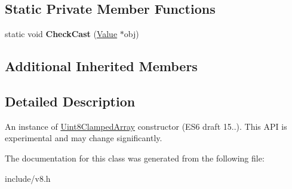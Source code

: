 \subsection*{Static Private Member Functions}
\begin{DoxyCompactItemize}
\item 
static void {\bfseries Check\+Cast} (\hyperlink{classv8_1_1_value}{Value} $\ast$obj)\hypertarget{classv8_1_1_uint8_clamped_array_a9f1ef355abd50168c2fc1ce02dae8d55}{}\label{classv8_1_1_uint8_clamped_array_a9f1ef355abd50168c2fc1ce02dae8d55}

\end{DoxyCompactItemize}
\subsection*{Additional Inherited Members}


\subsection{Detailed Description}
An instance of \hyperlink{classv8_1_1_uint8_clamped_array}{Uint8\+Clamped\+Array} constructor (E\+S6 draft 15..). This A\+PI is experimental and may change significantly. 

The documentation for this class was generated from the following file\+:\begin{DoxyCompactItemize}
\item 
include/v8.\+h\end{DoxyCompactItemize}
